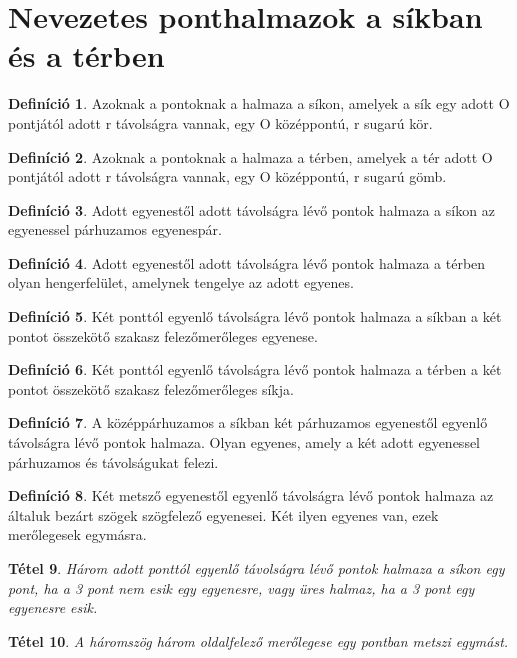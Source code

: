 \documentclass[twoside,12pt]{report}
\newtheorem{theorem}{Tétel}[section]
\theoremstyle{definition}
\newtheorem{definition}[theorem]{Definíció}
\begin{document}
\section{Nevezetes ponthalmazok a síkban és a térben}
	\begin{definition}
		Azoknak a pontoknak a halmaza a síkon, amelyek a sík egy adott O pontjától adott
		r távolságra vannak, egy O középpontú, r sugarú kör.
	\end{definition}
	\begin{definition}
		Azoknak a pontoknak a halmaza a térben, amelyek a tér adott O pontjától adott r távolságra
		vannak, egy O középpontú, r sugarú gömb.
	\end{definition}
	\begin{definition}
		Adott egyenestől adott távolságra lévő pontok halmaza a síkon az egyenessel párhuzamos
		egyenespár.
	\end{definition}
	\begin{definition}
		Adott egyenestől adott távolságra lévő pontok halmaza a térben olyan hengerfelület,
		amelynek tengelye az adott egyenes.
	\end{definition}
	\begin{definition}
		Két ponttól egyenlő távolságra lévő pontok halmaza a síkban a két pontot összekötő szakasz felezőmerőleges	egyenese.
	\end{definition}
	\begin{definition}
		Két ponttól egyenlő távolságra lévő pontok halmaza a térben a két pontot összekötő szakasz felezőmerőleges síkja.
	\end{definition}
	\begin{definition}
		A középpárhuzamos a síkban két párhuzamos egyenestől egyenlő távolságra lévő pontok halmaza. Olyan egyenes, amely a két adott egyenessel párhuzamos és távolságukat felezi.
	\end{definition}
	\begin{definition}
		Két metsző egyenestől egyenlő távolságra lévő pontok halmaza az általuk bezárt szögek
		szögfelező egyenesei. Két ilyen egyenes van, ezek merőlegesek egymásra.
	\end{definition}
	\begin{theorem}
		Három adott ponttól egyenlő távolságra lévő pontok halmaza a síkon egy pont, ha a 3 pont
		nem esik egy egyenesre, vagy üres halmaz, ha a 3 pont egy egyenesre esik.
	\end{theorem}
	\begin{theorem}
		A háromszög három oldalfelező merőlegese egy pontban metszi egymást.
	\end{theorem}
\end{document}
